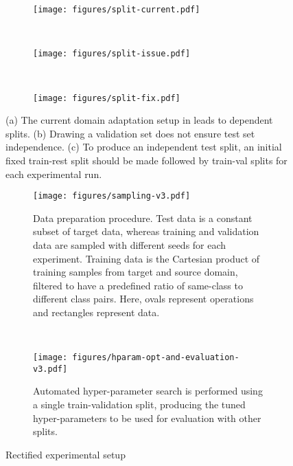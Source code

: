 \documentclass[journal]{IEEEtran}
\begin{document}
\begin{figure}
    \centering
    \begin{subfigure}[b]{0.3\linewidth}
        \texttt{[image: figures/split-current.pdf]}
		\caption{}
		\label{fig:no-val}
	\end{subfigure}
	\ \ \ 
    \begin{subfigure}[b]{0.3\linewidth}
        \texttt{[image: figures/split-issue.pdf]}
        \caption{}
		\label{fig:bad-val}
	\end{subfigure}
	\ \ \ 
	\begin{subfigure}[b]{0.3\linewidth}
	    \texttt{[image: figures/split-fix.pdf]}
	    \caption{}
		\label{fig:good-val}
	\end{subfigure}
    \caption{(a) The current domain adaptation setup in \cite{motiian2017ccsa, xu2019dsne} leads to dependent splits. (b) Drawing a validation set does not ensure test set independence. (c) To produce an independent test split, an initial fixed train-rest split should be made followed by train-val splits for each experimental run. }
    \label{fig:split-issues}
\end{figure}

\begin{figure*}
    \centering
    \begin{subfigure}[b]{0.65\linewidth}
        \texttt{[image: figures/sampling-v3.pdf]}
        \caption{Data preparation procedure. Test data is a constant subset of target data, whereas training and validation data are sampled with different seeds for each experiment. Training data is the Cartesian product of training samples from target and source domain, filtered to have a predefined ratio of same-class to different class pairs. Here, ovals represent operations and rectangles represent data.}
        \label{fig:data-prep}
	\end{subfigure}
	\ \ \ \ \ \ \
	\begin{subfigure}[b]{0.27\linewidth}
	    \texttt{[image: figures/hparam-opt-and-evaluation-v3.pdf]}
	    \caption{Automated hyper-parameter search is performed using a single train-validation split, producing the tuned hyper-parameters to be used for evaluation with other splits.}
		\label{fig:hparam-and-eval}
	\end{subfigure}
	\caption{Rectified experimental setup}
\end{figure*}
\end{document}
